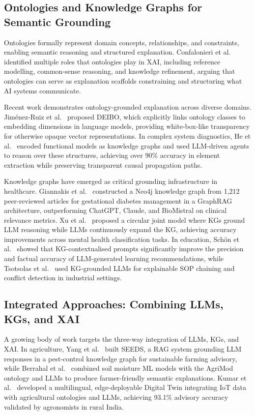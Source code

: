 \documentclass[lnbip]{svmultln}
\begin{document}
\subsection{Ontologies and Knowledge Graphs for Semantic Grounding}

Ontologies formally represent domain concepts, relationships, and constraints, enabling semantic reasoning and structured explanation. Confalonieri et al.~\cite{confalonieri2021} identified multiple roles that ontologies play in XAI, including reference modelling, common-sense reasoning, and knowledge refinement, arguing that ontologies can serve as explanation scaffolds constraining and structuring what AI systems communicate.

Recent work demonstrates ontology-grounded explanation across diverse domains. Jim\'{e}nez-Ruiz et al.~\cite{deibo2025} proposed DEIBO, which explicitly links ontology classes to embedding dimensions in language models, providing white-box-like transparency for otherwise opaque vector representations. In complex system diagnostics, He et al.~\cite{diag2025} encoded functional models as knowledge graphs and used LLM-driven agents to reason over these structures, achieving over 90\% accuracy in element extraction while preserving transparent causal propagation paths.

Knowledge graphs have emerged as critical grounding infrastructure in healthcare. Giannakis et al.~\cite{gdm2026} constructed a Neo4j knowledge graph from 1,212 peer-reviewed articles for gestational diabetes management in a GraphRAG architecture, outperforming ChatGPT, Claude, and BioMistral on clinical relevance metrics. Xu et al.~\cite{synkg2025} proposed a circular joint model where KGs ground LLM reasoning while LLMs continuously expand the KG, achieving accuracy improvements across mental health classification tasks. In education, Sch\"{o}n et al.~\cite{learn2024} showed that KG-contextualised prompts significantly improve the precision and factual accuracy of LLM-generated learning recommendations, while Tsotsolas et al.~\cite{sop2025} used KG-grounded LLMs for explainable SOP chaining and conflict detection in industrial settings.

\subsection{Integrated Approaches: Combining LLMs, KGs, and XAI}

A growing body of work targets the three-way integration of LLMs, KGs, and XAI. In agriculture, Yang et al.~\cite{seeds2025} built SEEDS, a RAG system grounding LLM responses in a pest-control knowledge graph for sustainable farming advisory, while Berrahal et al.~\cite{soil2025} combined soil moisture ML models with the AgriMod ontology and LLMs to produce farmer-friendly semantic explanations. Kumar et al.~\cite{agri2025} developed a multilingual, edge-deployable Digital Twin integrating IoT data with agricultural ontologies and LLMs, achieving 93.1\% advisory accuracy validated by agronomists in rural India.
\end{document}
